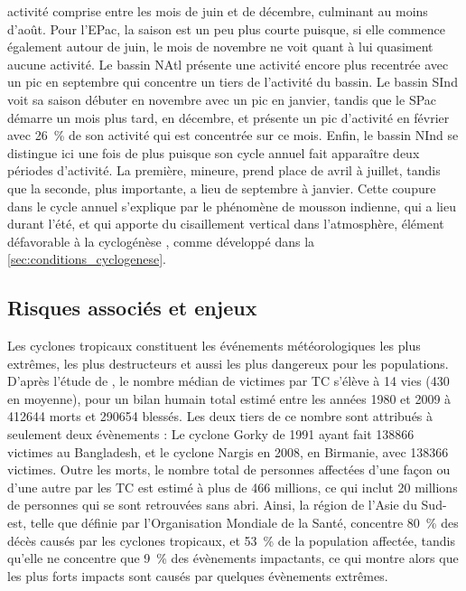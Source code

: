 \documentclass[../main.tex]{subfiles}
\begin{document}
activité comprise entre les mois de juin et de décembre, culminant au moins d'août. Pour l'EPac, la saison est un peu plus courte puisque, si elle commence
également autour de juin, le mois de novembre ne voit quant à lui quasiment aucune activité. Le bassin NAtl présente une activité encore plus recentrée avec un
pic en septembre qui concentre un tiers de l'activité du bassin. Le bassin SInd voit sa saison débuter en novembre avec un pic en janvier, tandis que le SPac
démarre un mois plus tard, en décembre, et présente un pic d'activité en février avec \SI{26}{\percent} de son activité qui est concentrée sur ce mois. Enfin,
le bassin NInd se distingue ici une fois de plus puisque son cycle annuel fait apparaître deux périodes d'activité. La première, mineure, prend place de avril à
juillet, tandis que la seconde, plus importante, a lieu de septembre à janvier. Cette coupure dans le cycle annuel s'explique par le phénomène de mousson
indienne, qui a lieu durant l'été, et qui apporte du cisaillement vertical dans l'atmosphère, élément défavorable à la cyclogénèse \parencite{gray_global_1968},
comme développé dans la \cref{sec:conditions_cyclogenese}.

\subsection{Risques associés et enjeux}\label{sec:risques}

Les cyclones tropicaux constituent les événements météorologiques les plus extrêmes, les plus destructeurs et aussi les plus dangereux pour les populations.
D'après l'étude de \cite{doocy_human_2013}, le nombre médian de victimes par TC s'élève à \num{14} vies (\num{430} en moyenne), pour un bilan humain total
estimé entre les années 1980 et 2009 à \num{412644} morts et \num{290654} blessés. Les deux tiers de ce nombre sont attribués à seulement deux évènements : Le
cyclone Gorky de 1991 ayant fait \num{138866} victimes au Bangladesh, et le cyclone Nargis en 2008, en Birmanie, avec \num{138366} victimes. Outre les morts, le
nombre total de personnes affectées d'une façon ou d'une autre par les TC est estimé à plus de \num{466} millions, ce qui inclut \num{20} millions de personnes
qui se sont retrouvées sans abri. Ainsi, la région de l'Asie du Sud-est, telle que définie par l'Organisation Mondiale de la Santé, concentre \SI{80}{\percent}
des décès causés par les cyclones tropicaux, et \SI{53}{\percent} de la population affectée, tandis qu'elle ne concentre que \SI{9}{\percent} des évènements
impactants, ce qui montre alors que les plus forts impacts sont causés par quelques évènements extrêmes.
\end{document}

